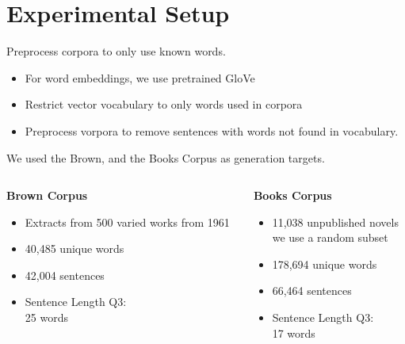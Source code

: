 \documentclass[]{beamer}
\begin{document}
\section{Experimental Setup}

\begin{frame}{Preprocess corpora to only use known words.}
	\begin{itemize}
		\item<1-> For word embeddings, we use pretrained GloVe 
		\item<2-> Restrict vector vocabulary to only words used in corpora
		\item<3-> Preprocess vorpora to remove sentences with words not found in vocabulary.
	\end{itemize}
\end{frame}

\begin{frame}{We used the Brown, and the Books Corpus as generation targets.}
	\pause
	\begin{columns}[T]
		\begin{column}{0.5\textwidth}
			\textbf{\textcolor{darkbrown}{Brown Corpus}}
			\begin{itemize}
				\item Extracts from 500 varied works from 1961
				\item 40,485 unique words
				\item 42,004 sentences
				\item Sentence Length Q3: \\\hfill 25 words
			\end{itemize} 
		\end{column}
		\begin{column}{0.5\textwidth}
			\pause
			\textbf{\textcolor{darkbrown}{Books Corpus}}
			\begin{itemize}
				\item 11,038 unpublished novels\\we use a random subset
				\item 178,694 unique words
				\item 66,464 sentences 
				\item Sentence Length Q3: \\\hfill 17 words
			\end{itemize}
		\end{column}
	\end{columns}

\end{frame}
\end{document}
